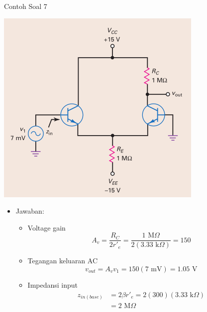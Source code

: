 \documentclass[aspectratio=169]{beamer}
\begin{document}
\begin{frame}{Contoh Soal 7}
	\begin{multicols}{2}
		\begin{center}
			\includegraphics[height=0.7\textheight]{gambar/01.diff-amp/01.contoh_soal_07}
		\end{center}
		\columnbreak
		\begin{itemize}
			\item Jawaban:
			\begin{itemize}
				\item Voltage gain
				\[ A_v = \frac{R_C}{2r'_e} = \frac{1 \text{ M}\Omega }{2 (3.33 \text{ k}\Omega) } = 150 \]
				\item Tegangan keluaran AC
				\[ v_{out} = A_v v_1 = 150(7 \text{ mV}) = 1.05 \text{ V} \]
				\item Impedansi input
				\begin{align*}
					z_{in(base)} &= 2 \beta r'_e = 2(300)(3.33 \text{ k}\Omega) \\
					&= 2 \text{ M}\Omega
				\end{align*}
			\end{itemize}
		\end{itemize}
	\end{multicols}
\end{frame}
\end{document}
